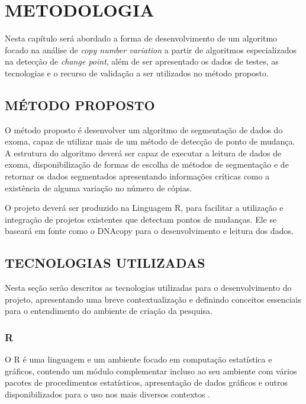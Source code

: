 
\chapter{METODOLOGIA}
\label{chap:metodologia}
Nesta capítulo será abordado a forma de desenvolvimento de um algoritmo focado na análise de \textit{copy number variation} a partir de algoritmos especializados na detecção de \textit{change point}, além de ser apresentado os dados de testes, as tecnologias e o recurso de validação a ser utilizados no método proposto.

\section{MÉTODO PROPOSTO}

O método proposto é desenvolver um algoritmo de segmentação de dados do exoma, capaz de utilizar mais de um método de detecção de ponto de mudança. A estrutura do algoritmo deverá ser capaz de executar a leitura de dados de exoma, disponibilização de formas de escolha de métodos de segmentação e de retornar os dados segmentados apresentando informações críticas como a existência de alguma variação no número de cópias.

O projeto deverá ser produzido na Linguagem R, para facilitar a utilização e integração de projetos existentes que detectam pontos de mudanças. Ele se baseará em fonte como o DNAcopy \cite{Olshen2004} para o desenvolvimento e leitura dos dados.

\section{TECNOLOGIAS UTILIZADAS}

Nesta seção serão descritos as tecnologias utilizadas para o desenvolvimento do projeto, apresentando uma breve contextualização e definindo conceitos essenciais para o entendimento do ambiente de criação da pesquisa.

\subsection{R}

O R \cite{Core2019} é uma linguagem e um ambiente focado em computação estatística e gráficos, contendo um módulo complementar incluso ao seu ambiente com vários pacotes de procedimentos estatísticos, apresentação de dados gráficos e outros disponibilizados para o uso nos mais diversos contextos \cite{website:Hornik2018}.


